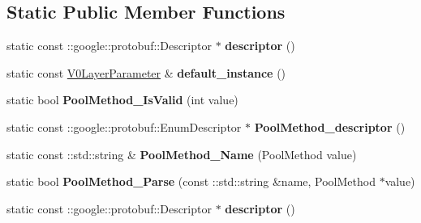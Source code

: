 \subsection*{Static Public Member Functions}
\begin{DoxyCompactItemize}
\item 
\mbox{\label{classcaffe_1_1_v0_layer_parameter_a982a64f274c40f3806d7fba826d4083e}} 
static const \+::google\+::protobuf\+::\+Descriptor $\ast$ {\bfseries descriptor} ()
\item 
\mbox{\label{classcaffe_1_1_v0_layer_parameter_a579049da311ae025e1e8cef48f405f4d}} 
static const \mbox{\hyperlink{classcaffe_1_1_v0_layer_parameter}{V0\+Layer\+Parameter}} \& {\bfseries default\+\_\+instance} ()
\item 
\mbox{\label{classcaffe_1_1_v0_layer_parameter_a21b74ae3eb9be456da31feddf0d93657}} 
static bool {\bfseries Pool\+Method\+\_\+\+Is\+Valid} (int value)
\item 
\mbox{\label{classcaffe_1_1_v0_layer_parameter_a53311f643d2753e1aed4aa11ec0709a0}} 
static const \+::google\+::protobuf\+::\+Enum\+Descriptor $\ast$ {\bfseries Pool\+Method\+\_\+descriptor} ()
\item 
\mbox{\label{classcaffe_1_1_v0_layer_parameter_a63113f83ad300e33bad58a3fd5756bd8}} 
static const \+::std\+::string \& {\bfseries Pool\+Method\+\_\+\+Name} (Pool\+Method value)
\item 
\mbox{\label{classcaffe_1_1_v0_layer_parameter_ae6fb40ea59964e2641fa029147feb2b5}} 
static bool {\bfseries Pool\+Method\+\_\+\+Parse} (const \+::std\+::string \&name, Pool\+Method $\ast$value)
\item 
\mbox{\label{classcaffe_1_1_v0_layer_parameter_ab4e8e054b4936926ac736a795721524a}} 
static const \+::google\+::protobuf\+::\+Descriptor $\ast$ {\bfseries descriptor} ()
\item 
\mbox{\label{classcaffe_1_1_v0_layer_parameter_a3553ad030a9287a8b73f483a9be355f9}} 

\end{DoxyCompactItemize}
